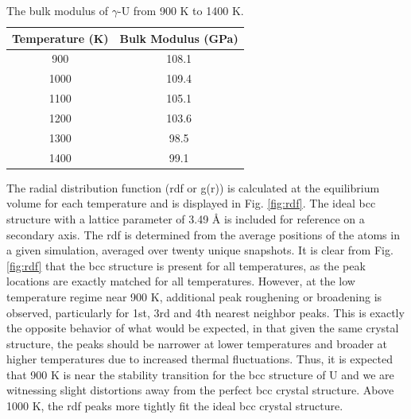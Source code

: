 \documentclass[review]{elsarticle}
\begin{document}
\begin{table}[h]
\caption{The bulk modulus of $\gamma$-U from 900 K to 1400 K.} \label{tab:bulk}
\begin{center}
\begin{tabular}{|c|c|}
	\hline
	Temperature (K) & Bulk Modulus (GPa) \\
	 \hline
	 900 & 108.1 \\
	 1000 & 109.4 \\
	 1100 & 105.1 \\
	 1200 & 103.6 \\	 
	 1300 & 98.5\\
	 1400 & 99.1 \\
	 \hline
\end{tabular}
\end{center}
\label{default}
\end{table}

\FloatBarrier

The radial distribution function (rdf or g(r)) is calculated at the equilibrium volume for each temperature and is displayed in Fig. \ref{fig:rdf}. The ideal bcc structure with a lattice parameter of 3.49 {\AA} is included for reference on a secondary axis. The rdf is determined from the average positions of the atoms in a given simulation, averaged over twenty unique snapshots. It is clear from Fig. \ref{fig:rdf} that the bcc structure is present for all temperatures, as the peak locations are exactly matched for all temperatures. However, at the low temperature regime near 900 K, additional peak roughening or broadening is observed, particularly for 1st, 3rd and 4th nearest neighbor peaks. This is exactly the opposite behavior of what would be expected, in that given the same crystal structure, the peaks should be narrower at lower temperatures and broader at higher temperatures due to increased thermal fluctuations. Thus, it is expected that 900 K is near the stability transition for the bcc structure of U and we are witnessing slight distortions away from the perfect bcc crystal structure. Above 1000 K, the rdf peaks more tightly fit the ideal bcc crystal structure.
\end{document}
